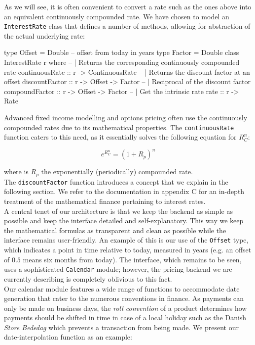 As we will see, it is often convenient to convert a rate such as the ones above
into an equivalent continuously compounded rate. We have chosen to model an
\texttt{InterestRate} class that defines a number of methods, allowing for
abstraction of the actual underlying rate:

\begin{hscode}
type Offset = Double -- offset from today in years
type Factor = Double
class InterestRate r where
  -- | Returns the corresponding continuously compounded rate
  continuousRate :: r -> ContinuousRate
  -- | Returns the discount factor at an offset
  discountFactor :: r -> Offset -> Factor 
  -- | Reciprocal of the discount factor
  compoundFactor :: r -> Offset -> Factor 
  -- | Get the intrinsic rate
  rate           :: r -> Rate
\end{hscode}

Advanced fixed income modelling and options 
pricing often use the continuously compounded rates due to its mathematical 
properties\cite{HULL}. The \texttt{continuousRate} function caters to this
need, as it essentially solves the following equation for $R_C^n$:

\begin{equation}
e^{R_C^n} = (1+R_p)^n
\end{equation}

where is $R_p$ the exponentially (periodically) compounded rate.\\

The \texttt{discountFactor} function introduces a concept that we
explain in the following section. We refer to the \hql documentation in appendix C
for an in-depth treatment of the mathematical finance pertaining to interest
rates.\\

A central tenet of our architecture is that we keep the backend
as simple as possible and keep the interface detailed and 
self-explanatory. This way we keep the mathematical formulas as transparent
and clean as possible while the interface remains user-friendly. An example
of this is our use of the \texttt{Offset} type, which indicates a point in 
time relative to today, measured in years (e.g. an offset of $0.5$
means six months from today). The interface, which remains to be seen, uses
a sophisticated \texttt{Calendar} module; however, the pricing backend we
are currently describing is completely oblivious to this fact.\\

Our calendar module features a wide range of functions to accommodate date
generation that cater to the numerous conventions in finance. As payments
can only be made on business days, the \emph{roll convention} of a product
determines how payments should be shifted in time in case of a local
holiday such as the Danish \emph{Store Bededag} which prevents a transaction from
being made. We present our date-interpolation function as an example:

